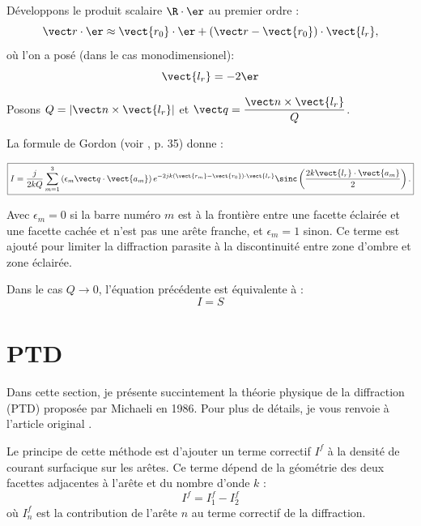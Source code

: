 Développons le produit scalaire $\R\cdot\er$ au premier ordre :
\begin{equation}
	\label{eq:gordon_dvp}
	\vect r\cdot\er\approx \vect{r_0}\cdot\er+\left(\vect r-\vect{r_0}\right)\cdot\vect{l_r},
\end{equation}
%
où l'on a posé (dans le cas monodimensionel):
\begin{equation}
	\label{eq:gordon_lr}
	\vect{l_r} = -2\er
\end{equation}

Posons $Q = |\vect n\times\vect{l_r}|$ et $\vect q = \dfrac{\vect n\times\vect{l_r}}{Q}$.

La formule de Gordon (voir \cite{Laval2006}, p. 35) donne :

\begin{equation}
	\label{eq:gordon_res}
	\boxed{
	I = \frac{j}{2kQ}\sum_{m=1}^3\left(\epsilon_m\vect q\cdot\vect{a_m}\right)e^{-2jk\left(\vect{r_m}-\vect{r_0}\right)\cdot\vect{l_r}}\sinc\left(\frac{2k\vect{l_r}\cdot\vect{a_m}}{2}\right).
	}
\end{equation}

Avec $\epsilon_m = 0$ si la barre numéro $m$ est à la frontière entre une facette éclairée et une facette cachée et n'est pas une arête franche, et $\epsilon_m = 1$ sinon. Ce terme est ajouté pour limiter la diffraction parasite à la discontinuité entre zone d'ombre et zone éclairée. %

Dans le cas $Q \to 0$, l'équation précédente est équivalente à :
\begin{equation}
	\label{eq:gordon_res_0}
	I = S
\end{equation}


\section{PTD}
\label{sec:PTD}
Dans cette section, je présente succintement la théorie physique de la diffraction (PTD) proposée par Michaeli en 1986. Pour plus de détails, je vous renvoie à l'article original \cite{Michaeli1986a}.

Le principe de cette méthode est d'ajouter un terme correctif $I^f$ à la densité de courant surfacique sur les arêtes. Ce terme dépend de la géométrie des deux facettes adjacentes à l'arête et du nombre d'onde $k$ : $$I^f = I_1^f - I_2^f$$ où $I_n^f$ est la contribution de l'arête $n$ au terme correctif de la diffraction.

